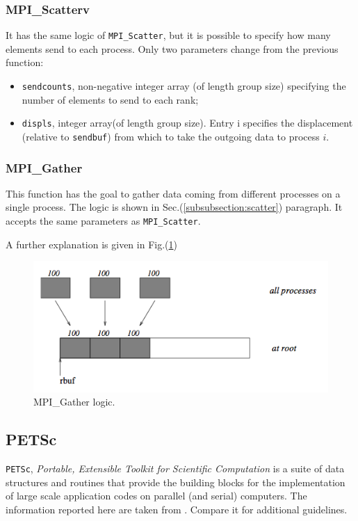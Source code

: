 \subsubsection{MPI\_Scatterv}\label{subsubsection:scatterv}
It has the same logic of \verb|MPI_Scatter|, but it is possible to specify how many elements send to each process. Only two parameters change from the previous function:

\begin{itemize}
\item \verb|sendcounts|, non-negative integer array (of length group size) specifying the number of elements to send to each rank;
\item \verb|displs|, integer array(of length group size). Entry i specifies the displacement (relative to \verb|sendbuf|) from which to take the outgoing data to process $i$.
\end{itemize}

\subsubsection{MPI\_Gather}\label{subsubsection:gather}
This function has the goal to gather data coming from different processes on a single process. The logic is shown in Sec.(\ref{subsubsection:scatter}) paragraph. It accepts the same parameters as \verb|MPI_Scatter|.

A further explanation is given in Fig.(\ref{fig:gather})

\begin{figure}
\centering
\includegraphics[scale=.45]{images/gather.png}
\caption{MPI\_Gather logic.}
\label{fig:gather}
\end{figure}

\subsection{PETSc}\label{subsection:PETSc}
\verb|PETSc|, \textit{Portable, Extensible Toolkit for Scientific Computation} is a suite of data structures and routines that provide the building blocks for the implementation of large scale application codes on parallel (and serial) computers. The information reported here are taken from \cite{petsc}. Compare it for additional guidelines.

